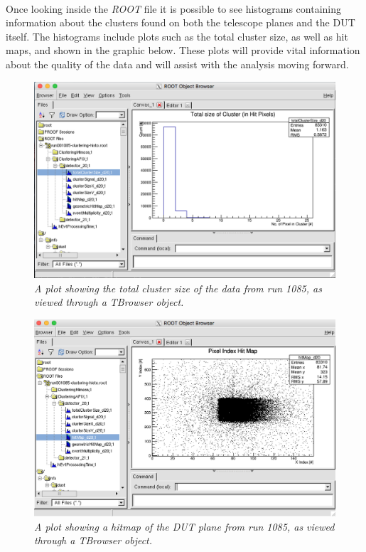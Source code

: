 \documentclass[11pt]{article}
\begin{document}
\paragraph{}
Once looking inside the \textit{ROOT} file it is possible to see histograms containing information about the clusters found on both the telescope planes and the DUT itself. The histograms include plots such as the total cluster size, as well as hit maps, and shown in the graphic below. These plots will provide vital information about the quality of the data and will assist with the analysis moving forward.
\begin{figure}[!ht]
	\centering
	\includegraphics[scale=0.4]{images/clustering_totalclustersize.png}
	\caption{\textit{A plot showing the total cluster size of the data from run 1085, as viewed through a TBrowser object.}}
\end{figure}
\begin{figure}[!ht]
	\centering
	\includegraphics[scale=0.4]{images/clustering_hitmap.png}
	\caption{\textit{A plot showing a hitmap of the DUT plane from run 1085, as viewed through a TBrowser object.}}
\end{figure}
\end{document}
